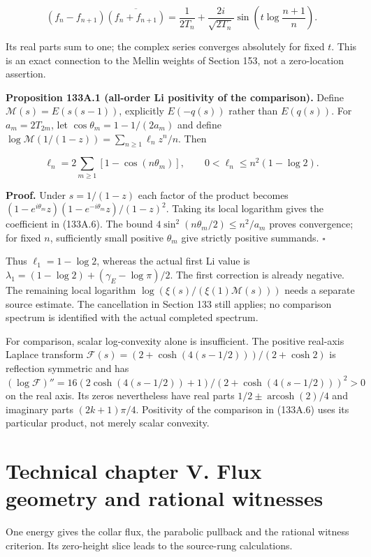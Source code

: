 \documentclass[
  11pt,
]{book}
\begin{document}
\[
(f_n-f_{n+1})\overline{(f_n+f_{n+1})}
=\frac1{2T_n}+\frac{2i}{\sqrt{2T_n}}
 \sin\left(t\log\frac{n+1}{n}\right).
\tag{133A.5}
\]

Its real parts sum to one; the complex series converges absolutely for
fixed \(t\). This is an exact connection to the Mellin weights of
Section 153, not a zero-location assertion.

\textbf{Proposition 133A.1 (all-order Li positivity of the comparison).}
Define \(\mathcal M(s)=E(s(s-1))\), explicitly \(E(-q(s))\) rather than
\(E(q(s))\). For \(a_m=2T_{2m}\), let \(\cos\theta_m=1-1/(2a_m)\) and
define \(\log\mathcal M(1/(1-z))=\sum_{n\ge1}\ell_nz^n/n\). Then

\[
\boxed{\ell_n=2\sum_{m\ge1}[1-\cos(n\theta_m)],\qquad
0<\ell_n\le n^2(1-\log2).}
\tag{133A.6}
\]

\textbf{Proof.} Under \(s=1/(1-z)\) each factor of the product becomes
\((1-e^{i\theta_m}z)(1-e^{-i\theta_m}z)/(1-z)^2\). Taking its local
logarithm gives the coefficient in (133A.6). The bound
\(4\sin^2(n\theta_m/2)\le n^2/a_m\) proves convergence; for fixed \(n\),
sufficiently small positive \(\theta_m\) give strictly positive
summands. \(\square\)

Thus \(\ell_1=1-\log2\), whereas the actual first Li value is
\(\lambda_1=(1-\log2)+(\gamma_E-\log\pi)/2\). The first correction is
already negative. The remaining local logarithm
\(\log(\xi(s)/(\xi(1)\mathcal M(s)))\) needs a separate source estimate.
The cancellation in Section 133 still applies; no comparison spectrum is
identified with the actual completed spectrum.

For comparison, scalar log-convexity alone is insufficient. The positive
real-axis Laplace transform
\(\mathcal F(s)=(2+\cosh(4(s-1/2)))/(2+\cosh2)\) is reflection symmetric
and has
\((\log\mathcal F)''=16(2\cosh(4(s-1/2))+1)/(2+\cosh(4(s-1/2)))^2>0\) on
the real axis. Its zeros nevertheless have real parts
\(1/2\pm\operatorname{arcosh}(2)/4\) and imaginary parts
\((2k+1)\pi/4\). Positivity of the comparison in (133A.6) uses its
particular product, not merely scalar convexity.


\chapter{Technical chapter V. Flux geometry and rational
witnesses}\label{technical-chapter-v.-flux-geometry-and-rational-witnesses}

One energy gives the collar flux, the parabolic pullback and the
rational witness criterion. Its zero-height slice leads to the
source-rung calculations.
\end{document}
